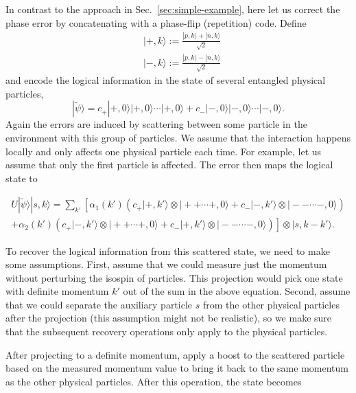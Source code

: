 \documentclass[11pt,english]{article}
\newcommand{\Sec}[1]{Sec.~\ref{#1}}
\begin{document}
In contrast to the approach in \Sec{sec:simple-example}, here let us correct the phase error by concatenating with a phase-flip (repetition) code. Define 
\begin{equation}
\begin{split}
   & |+,k\rangle:=\frac{|p,k\rangle+|n,k\rangle}{\sqrt{2}}\\
   & |-,k\rangle:=\frac{|p,k\rangle-|n,k\rangle}{\sqrt{2}}
\end{split}
\end{equation}
and encode the logical information in the state of several entangled physical particles, 
\begin{equation}\label{eqrepetition}
  |\tilde{\psi}\rangle=  c_{+}|+,0\rangle|+,0\rangle\cdots |+,0\rangle+c_{-}|-,0\rangle|-,0\rangle\cdots|-,0\rangle.
\end{equation}
Again the errors are induced by scattering between some particle in the environment with this group of particles. We assume that the interaction happens locally and only affects one physical particle each time. For example, let us assume that only the first particle is affected. The error then maps the logical state to

\begin{equation}
\begin{split}
    U|\tilde{\psi}\rangle|s,k\rangle = \sum_{k'}\left[\alpha_1(k')\left(c_{+}|+,k'\rangle\otimes|++\cdots+,0\rangle+c_{-}|-,k'\rangle\otimes|--\cdots-,0\rangle\right)\right. \\ + \left. \alpha_2(k')\left(c_+|-,k'\rangle\otimes|++\cdots+,0\rangle+c_-|+,k'\rangle\otimes|--\cdots-,0\rangle\right)\right]\otimes|s,k-k'\rangle.
\end{split}
\end{equation}

To recover the logical information from this scattered state, we need to make some assumptions. First, assume that we could  measure just the momentum  without perturbing the isospin of particles. This projection would pick one state with definite momentum $k'$ out of the sum in the above equation. Second, assume that we could separate the auxiliary particle $s$ from the other physical particles after the projection (this assumption might not be realistic), so we make sure that the subsequent recovery operations only apply to the physical particles. 

After projecting to a definite momentum, apply a boost to the scattered particle based on the measured momentum value to bring it back to the same momentum as the other physical particles. After this operation, the state becomes
\end{document}
